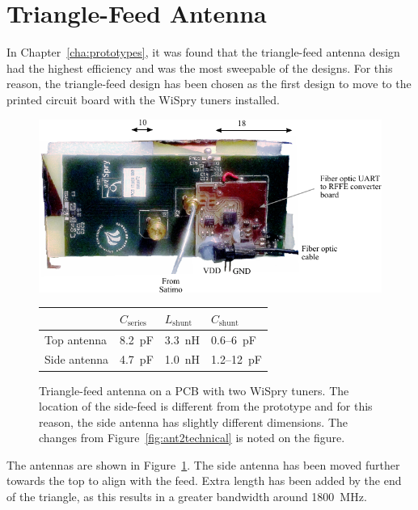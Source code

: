 \section{Triangle-Feed Antenna}
\label{sec:triag_proto_wispry}

In Chapter~\ref{cha:prototypes}, it was found that the triangle-feed antenna design had the highest efficiency and was the most sweepable of the designs. For this reason, the triangle-feed design has been chosen as the first design to move to the printed circuit board with the WiSpry tuners installed. 

\begin{figure}[htbp]
    \centering
    \includegraphics{img/tech_sol/pcb_trianglefeed/pcb_enh}\\[2em]
    \footnotesize
    \begin{tabular}{|l|l|l|l|}
        \hline
        & $C_{\text{series}}$ & $L_{\text{shunt}}$ & $C_{\text{shunt}}$ \\
        \hline
        Top antenna & \SI{8.2}{pF} & \SI{3.3}{nH} & 0.6--\SI{6}{pF} \\
        Side antenna & \SI{4.7}{pF} & \SI{1.0}{nH} & 1.2--\SI{12}{pF} \\
        \hline
    \end{tabular}
    \caption{Triangle-feed antenna on a PCB with two WiSpry tuners. The location of the side-feed is different from the prototype and for this reason, the side antenna has slightly different dimensions. The changes from Figure~\ref{fig:ant2technical} is noted on the figure.}
    \label{fig:triang_pcb_enh}
\end{figure}

The antennas are shown in Figure~\ref{fig:triang_pcb_enh}. The side antenna has been moved further towards the top to align with the feed. Extra length has been added by the end of the triangle, as this results in a greater bandwidth around \SI{1800}{MHz}.

